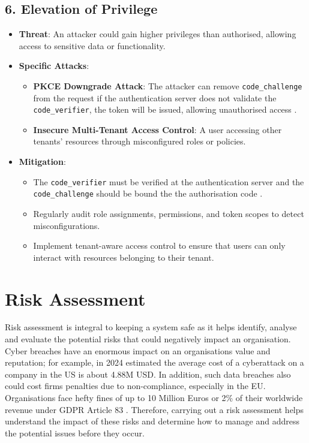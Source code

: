 \subsection*{6. Elevation of Privilege}
\begin{itemize}
    \item \textbf{Threat}: An attacker could gain higher privileges than authorised, allowing access to sensitive data or functionality.
    \item \textbf{Specific Attacks}:
    \begin{itemize}
        \item \textbf{PKCE Downgrade Attack}: The attacker can remove \texttt{code\_challenge} from the request if the authentication server does not validate the \texttt{code\_verifier}, the token will be issued, allowing unauthorised access \citep{oidc_attacks}.
        \item \textbf{Insecure Multi-Tenant Access Control}: A user accessing other tenants' resources through misconfigured roles or policies.
    \end{itemize}
    \item \textbf{Mitigation}:
    \begin{itemize}
        \item The \texttt{code\_verifier} must be verified at the authentication server and the \texttt{code\_challenge} should be bound the the authorisation code \citep{oidc_attacks}.
        \item Regularly audit role assignments, permissions, and token scopes to detect misconfigurations.
        \item Implement tenant-aware access control to ensure that users can only interact with resources belonging to their tenant.
    \end{itemize}
\end{itemize}


\section{Risk Assessment}
Risk assessment is integral to keeping a system safe as it helps identify, analyse and evaluate the potential risks that could negatively impact an organisation. Cyber breaches have an enormous impact on an organisations value and reputation; for example, in 2024 \citep{ibm} estimated the average cost of a cyberattack on a company in the US is about 4.88M USD. In addition, such data breaches also could cost firms penalties due to non-compliance, especially in the EU. Organisations face hefty fines of up to 10 Million Euros or 2\% of their worldwide revenue under GDPR Article 83 \citep{gdpr_fine}. Therefore, carrying out a risk assessment helps understand the impact of these risks and determine how to manage and address the potential issues before they occur. 

